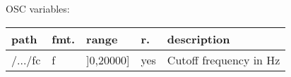 \begin{snugshade}
{\footnotesize
\label{osctab:tascarapfilter}
OSC variables:
\nopagebreak

\begin{tabularx}{\textwidth}{llllX}
\hline
path & fmt. & range & r. & description\\
\hline
/.../fc & f & ]0,20000] & yes & Cutoff frequency in Hz\\
\hline
\end{tabularx}
}
\end{snugshade}
